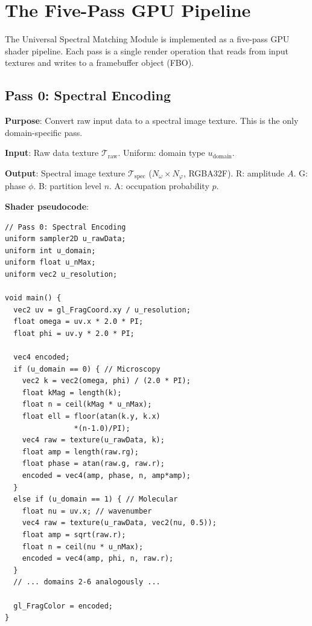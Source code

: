 \documentclass[11pt,twocolumn,a4paper]{article}
\begin{document}


\section{The Five-Pass GPU Pipeline}
\label{sec:five_pass}

The Universal Spectral Matching Module is implemented as a five-pass
GPU shader pipeline. Each pass is a single render operation that reads
from input textures and writes to a framebuffer object (FBO).

\subsection{Pass 0: Spectral Encoding}
\label{subsec:pass0}

\textbf{Purpose}: Convert raw input data to a spectral image texture.
This is the only domain-specific pass.

\textbf{Input}: Raw data texture $\mathcal{T}_{\text{raw}}$.
Uniform: domain type $u_{\text{domain}}$.

\textbf{Output}: Spectral image texture $\mathcal{T}_{\text{spec}}$
($N_\omega \times N_\varphi$, RGBA32F).
R: amplitude $A$. G: phase $\phi$. B: partition level $n$. A: occupation
probability $p$.

\textbf{Shader pseudocode}:
\begin{lstlisting}[style=glsl]
// Pass 0: Spectral Encoding
uniform sampler2D u_rawData;
uniform int u_domain;
uniform float u_nMax;
uniform vec2 u_resolution;

void main() {
  vec2 uv = gl_FragCoord.xy / u_resolution;
  float omega = uv.x * 2.0 * PI;
  float phi = uv.y * 2.0 * PI;

  vec4 encoded;
  if (u_domain == 0) { // Microscopy
    vec2 k = vec2(omega, phi) / (2.0 * PI);
    float kMag = length(k);
    float n = ceil(kMag * u_nMax);
    float ell = floor(atan(k.y, k.x)
                *(n-1.0)/PI);
    vec4 raw = texture(u_rawData, k);
    float amp = length(raw.rg);
    float phase = atan(raw.g, raw.r);
    encoded = vec4(amp, phase, n, amp*amp);
  }
  else if (u_domain == 1) { // Molecular
    float nu = uv.x; // wavenumber
    vec4 raw = texture(u_rawData, vec2(nu, 0.5));
    float amp = sqrt(raw.r);
    float n = ceil(nu * u_nMax);
    encoded = vec4(amp, phi, n, raw.r);
  }
  // ... domains 2-6 analogously ...

  gl_FragColor = encoded;
}
\end{lstlisting}
\end{document}
